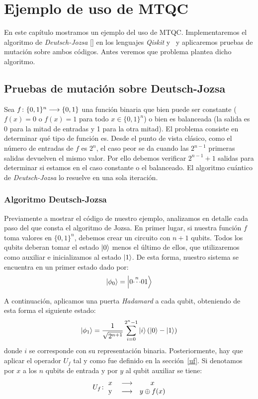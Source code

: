 \chapter{Ejemplo de uso de MTQC}

En este capítulo mostramos un ejemplo del uso de MTQC. Implementaremos el algoritmo de \textit{Deutsch-Jozsa} [\cite{deutsch1992rapid}] en los lenguajes \textit{Qiskit} y \qsh\ y aplicaremos pruebas de mutación sobre ambos códigos. Antes veremos que problema plantea dicho algoritmo.

\section{Pruebas de mutación sobre Deutsch-Jozsa}

Sea $f\colon \{0,1\}^n\longrightarrow \{0,1\}$ una función binaria que bien puede ser constante ($f(x) = 0$ o $f(x) = 1$ para todo $x\in\{0,1\}^n$) o bien es balanceada (la salida es 0 para la mitad de entradas y 1 para la otra mitad). El problema consiste en determinar qué tipo de función es. Desde el punto de vista clásico, como el número de entradas de $f$ es $2^n$, el caso peor se da cuando las $2^{n-1}$ primeras salidas devuelven el mismo valor. Por ello debemos verificar $2^{n-1}+1$ salidas para determinar si estamos en el caso constante o el balanceado. El algoritmo cuántico de \textit{Deutsch-Jozsa} lo resuelve en una sola iteración.

\subsection{Algoritmo Deutsch-Jozsa}

Previamente a mostrar el código de nuestro ejemplo, analizamos en detalle cada paso del que consta el algoritmo de Jozsa. En primer lugar, si nuestra función $f$ toma valores en $\{0,1\}^n$, debemos crear un circuito con $n + 1$ qubits. Todos los qubits deberan tomar el estado $\left|0\right\rangle$ menos el último de ellos, que utilizaremos como auxiliar e inicializamos al estado $\left|1\right\rangle$. De esta forma, nuestro sistema se encuentra en un primer estado dado por:
\[\left|\phi_0\right\rangle = \left|0\overset{n}{\cdots}01\right\rangle\]

A continuación, aplicamos una puerta \textit{Hadamard} a cada qubit, obteniendo de esta forma el siguiente estado:
$$\left|\phi_1\right\rangle = \dfrac{1}{\sqrt{2^{n+1}}} \sum\limits_{i=0}^{2^n - 1} \left|i\right\rangle(\left|0\right\rangle-\left|1\right\rangle) 
$$
donde $i$ se corresponde con su representación binaria.
Posteriormente, hay que aplicar el operador $U_f$ tal y como fue definido en la sección~\ref{uf}. Si denotamos por $x$ a los $n$ qubits de entrada y por $y$ al qubit auxiliar se tiene:
$$U_f\colon \begin{matrix}x&\longrightarrow& x\\ \mathrm{\ y\ }&\longrightarrow& y\oplus f(x)\end{matrix}
$$

